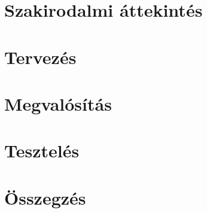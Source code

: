 \documentclass[a4paper,12pt]{article}
\begin{document}
\section{Szakirodalmi áttekintés}

\section{Tervezés}

\section{Megvalósítás}

\section{Tesztelés}

\section{Összegzés}


\end{document}
